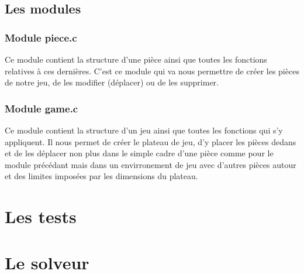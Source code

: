 \documentclass{report}
\begin{document}
\section{Les modules}
\subsection*{Module piece.c}
Ce module contient la structure d'une pièce ainsi que toutes les fonctions relatives à ces dernières. C'est ce module qui va nous permettre de créer les pièces de notre jeu, de les modifier (déplacer) ou de les supprimer.
\subsection*{Module game.c}
Ce module contient la structure d'un jeu ainsi que toutes les fonctions qui s'y appliquent. Il nous permet de créer le plateau de jeu, d'y placer les pièces dedans et de les déplacer non plus dans le simple cadre d'une pièce comme pour le module précédant mais dans un envirronement de jeu avec d'autres pièces autour et des limites imposées par les dimensions du plateau.



\chapter{Les tests}
\setcounter{section}{0}



\chapter{Le solveur}
\setcounter{section}{0}
\end{document}

